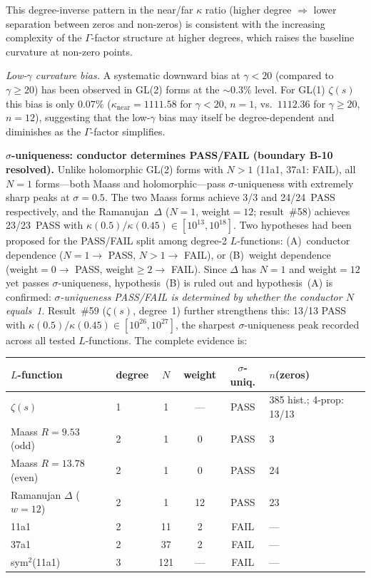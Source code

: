 \documentclass[11pt, a4paper]{article}
\theoremstyle{definition}
\theoremstyle{plain}
\begin{document}
\noindent
This degree-inverse pattern in the near/far $\kappa$ ratio
(higher degree $\Rightarrow$ lower separation between zeros and non-zeros)
is consistent with the increasing complexity of the $\Gamma$-factor
structure at higher degrees, which raises the baseline curvature at
non-zero points.

\medskip\noindent
\emph{Low-$\gamma$ curvature bias.}\;
A systematic downward bias at $\gamma < 20$ (compared to $\gamma \geq 20$)
has been observed in GL(2) forms at the ${\sim}0.3\%$ level.
For GL(1) $\zeta(s)$ this bias is only $0.07\%$
($\kappa_{\mathrm{near}} = 1111.58$ for $\gamma < 20$, $n{=}1$, vs.\
$1112.36$ for $\gamma \geq 20$, $n{=}12$),
suggesting that the low-$\gamma$ bias may itself be degree-dependent
and diminishes as the $\Gamma$-factor simplifies.

\medskip\noindent
\textbf{$\sigma$-uniqueness: conductor determines PASS/FAIL (boundary B-10 resolved).}
Unlike holomorphic GL(2) forms with $N > 1$ (11a1, 37a1: FAIL),
all $N{=}1$ forms---both Maass and holomorphic---pass $\sigma$-uniqueness
with extremely sharp peaks at $\sigma = 0.5$.
The two Maass forms achieve 3/3 and 24/24~PASS respectively,
and the Ramanujan~$\Delta$ ($N{=}1$, weight${=}12$; result~\#58)
achieves 23/23~PASS with $\kappa(0.5)/\kappa(0.45) \in [10^{13}, 10^{18}]$.
Two hypotheses had been proposed for the PASS/FAIL split among degree-2 $L$-functions:
(A)~conductor dependence ($N{=}1 \to$ PASS, $N{>}1 \to$ FAIL), or
(B)~weight dependence (weight${=}0 \to$ PASS, weight${\geq}2 \to$ FAIL).
Since $\Delta$ has $N{=}1$ and weight${=}12$ yet passes $\sigma$-uniqueness,
hypothesis~(B) is ruled out and hypothesis~(A) is confirmed:
\emph{$\sigma$-uniqueness PASS/FAIL is determined by whether the conductor $N$ equals~1}.
Result~\#59 ($\zeta(s)$, degree~1) further strengthens this:
13/13 PASS with $\kappa(0.5)/\kappa(0.45) \in [10^{26}, 10^{27}]$,
the sharpest $\sigma$-uniqueness peak recorded across all tested $L$-functions.
The complete evidence is:

\smallskip
\begin{center}
\small
\begin{tabular}{llcccl}
\toprule
$L$-function & degree & $N$ & weight & $\sigma$-uniq. & $n$(zeros) \\
\midrule
$\zeta(s)$ & 1 & 1 & --- & PASS & 385 hist.; 4-prop: 13/13 \\
Maass $R{=}9.53$ (odd) & 2 & 1 & 0 & PASS & 3 \\
Maass $R{=}13.78$ (even) & 2 & 1 & 0 & PASS & 24 \\
Ramanujan $\Delta$ ($w{=}12$) & 2 & 1 & 12 & PASS & 23 \\
\midrule
11a1 & 2 & 11 & 2 & FAIL & --- \\
37a1 & 2 & 37 & 2 & FAIL & --- \\
sym$^2$(11a1) & 3 & 121 & --- & FAIL & --- \\
\bottomrule
\end{tabular}
\end{center}
\smallskip
\end{document}
